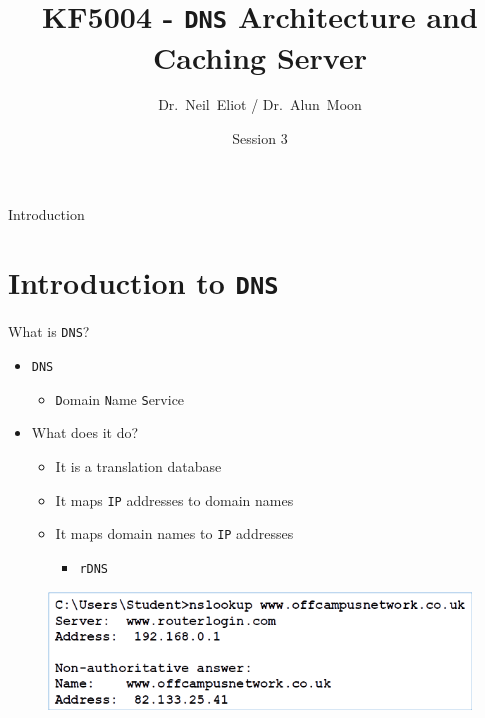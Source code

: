 \documentclass{beamer}
\title{KF5004 - \texttt{DNS} Architecture and Caching Server}
\author{Dr.~Neil~Eliot\inst{1} / Dr.~Alun~Moon\inst{1}}
\institute[Northumbria University] %
{
  \inst{1}
  Department of Computer and Information Sciences\\
  University of Northumbria
}
\date{Session 3}
\begin{document}
\begin{frame}
  \titlepage
\end{frame}

\begin{frame}{Introduction}
  \tableofcontents
\end{frame}


\section{Introduction to \texttt{DNS}}
\begin{frame}{What is \texttt{DNS}?}
  \begin{itemize}
    \item \texttt{DNS}
      \begin{itemize}
          \item \texttt{D}omain \texttt{N}ame \texttt{S}ervice
      \end{itemize}
    \item What does it do?   
      \begin{itemize}
        \item It is a translation database
        \item It maps \texttt{IP} addresses to domain names
        \item It maps domain names to \texttt{IP} addresses
          \begin{itemize}
            \item \texttt{rDNS}
          \end{itemize}
      \end{itemize} 
  \end{itemize}
  \begin{figure}
    \begin{center}
      \includegraphics[width=0.8\linewidth]{nslookup.png}
    \end{center}
  \end{figure}
\end{frame}
\end{document}
